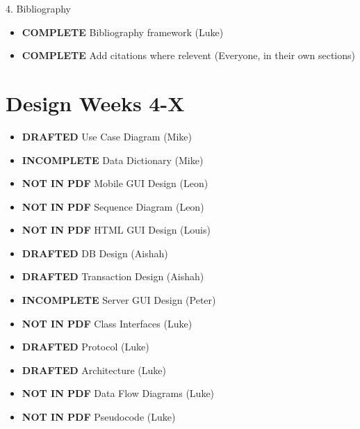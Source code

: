 4. Bibliography
\begin{itemize}
\item \textbf{COMPLETE} Bibliography framework (Luke)
\item \textbf{COMPLETE} Add citations where relevent (Everyone, in their own sections)
\end{itemize}

\section{Design \textbf{Weeks 4-X}}
\begin{itemize}
\item \textbf{DRAFTED}       Use Case Diagram (Mike)
\item \textbf{INCOMPLETE}    Data Dictionary (Mike)
\item \textbf{NOT IN PDF}    Mobile GUI Design (Leon)
\item \textbf{NOT IN PDF}    Sequence Diagram (Leon)
\item \textbf{NOT IN PDF}    HTML GUI Design (Louis)
\item \textbf{DRAFTED}       DB Design (Aishah)
\item \textbf{DRAFTED}       Transaction Design (Aishah)
\item \textbf{INCOMPLETE}    Server GUI Design (Peter)
\item \textbf{NOT IN PDF}    Class Interfaces (Luke)
\item \textbf{DRAFTED}       Protocol (Luke)
\item \textbf{DRAFTED}       Architecture (Luke)
\item \textbf{NOT IN PDF}    Data Flow Diagrams (Luke)
\item \textbf{NOT IN PDF}    Pseudocode (Luke)
\end{itemize}
